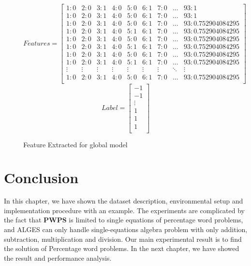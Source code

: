 \documentclass[document.tex]{subfiles}
\begin{document}
	\begin{figure}[H]
		\[
		Features = 
		\begin{bmatrix}
		1:0 & 2:0 &  3:1 & 4:0 & 5:0 & 6:1 & 7:0 & \dots & 93:1\\ 
		1:0 & 2:0 & 3:1 & 4:0 & 5:0 & 6:1 & 7:0 & \dots & 93:1\\ 
		1:0 & 2:0 & 3:1 & 4:0 & 5:0 & 6:1 & 7:0 & \dots & 93:0.752904084295\\
		1:0 & 2:0 & 3:1 & 4:0 & 5:1 & 6:1 & 7:0 & \dots & 93:0.752904084295\\
		1:0 & 2:0 & 3:1 & 4:0 & 5:0 & 6:1 & 7:0 & \dots & 93:0.752904084295\\
		1:0 & 2:0 & 3:1 & 4:0 & 5:1 & 6:1 & 7:0 & \dots & 93:0.752904084295\\
		1:0 & 2:0 & 3:1 & 4:0 & 5:0 & 6:1 & 7:0 & \dots & 93:0.752904084295\\
		1:0 & 2:0 & 3:1 & 4:0 & 5:1 & 6:1 & 7:0 & \dots & 93:0.752904084295\\
		\vdots & \vdots & \vdots & \vdots & \vdots & \vdots & \vdots & \ddots & \vdots\\
		1:0 & 2:0 & 3:1 & 4:0 & 5:0 & 6:1 & 7:0 & \dots & 93:0.752904084295\\
		\end{bmatrix}
		\]
		\[Label = 
		\begin{bmatrix}
		-1 \\ 
		-1\\ 
		\vdots\\
		1\\
		1\\
		1\\
		\end{bmatrix}
		\]
		\caption{Feature Extracted for global model}
		\label{fig:i_global}
	\end{figure}
\section{Conclusion} In this chapter, we have shown the dataset description, environmental setup and implementation procedure with an example. The experiments are complicated by the fact that \textbf{PWPS} is limited to single equations of percentage word problems, and ALGES can only handle single-equations algebra problem with only addition, subtraction, multiplication and division. Our main experimental result is to find the solution of Percentage word problems. In the next chapter, we have showed the result and performance analysis.
\end{document}
